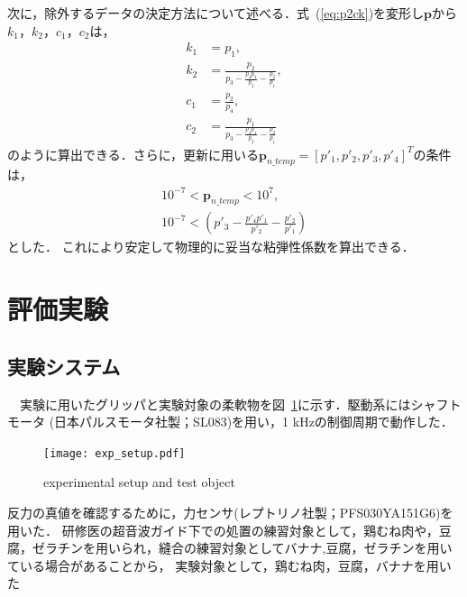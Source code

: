 \documentclass[a4paper]{jarticle}
\begin{document}
次に，除外するデータの決定方法について述べる．式~(\ref{eq:p2ck})を変形し$\mathbf{p}$から$k_1$，$k_2$，$c_1$，$c_2$は，
\begin{equation}
    \begin{aligned}
        k_1 &= p_1 ,\\
        k_2 &= \frac{p_2}{p_3 - \frac{p_4 p_1}{p_2} - \frac{p_2}{p_1}} ,\\
        c_1 &= \frac{p_2}{p_4},\\
        c_2 &= \frac{p_1}{p_3 - \frac{p_4 p_1}{p_2} - \frac{p_2}{p_1}} 
    \end{aligned}
\end{equation}
のように算出できる．さらに，更新に用いる$\mathbf{p}_{n\_temp}=[p'_1,p'_2,p'_3,p'_4]^{T}$の条件は，
\begin{equation}
    \begin{aligned}
        10^{-7} < \mathbf{p}_{n\_temp} < 10^{7} ,\\
        10^{-7} < \left( p'_3 - \frac{p'_4 p'_1}{p'_2} - \frac{p'_2}{p'_1} \right)
    \end{aligned}
\end{equation}
とした．
これにより安定して物理的に妥当な粘弾性係数を算出できる．
\section{評価実験}
\subsection{実験システム}
　実験に用いたグリッパと実験対象の柔軟物を図~\ref{fig:exp_setup}に示す．駆動系にはシャフトモータ (日本パルスモータ社製；SL083)を用い，1 kHzの制御周期で動作した．
\begin{figure}[htbp]
    \centering
    \texttt{[image: exp\_setup.pdf]}
    \caption{experimental setup and test object}
    \label{fig:exp_setup}
\end{figure}
反力の真値を確認するために，力センサ(レプトリノ社製；PFS030YA151G6)を用いた．
研修医の超音波ガイド下での処置の練習対象として，鶏むね肉や，豆腐，ゼラチンを用いられ，縫合の練習対象としてバナナ,豆腐，ゼラチンを用いている場合があることから\cite{exp_ref1}\cite{exp_ref2}\cite{exp_ref3}，
実験対象として，鶏むね肉，豆腐，バナナを用いた
\end{document}
